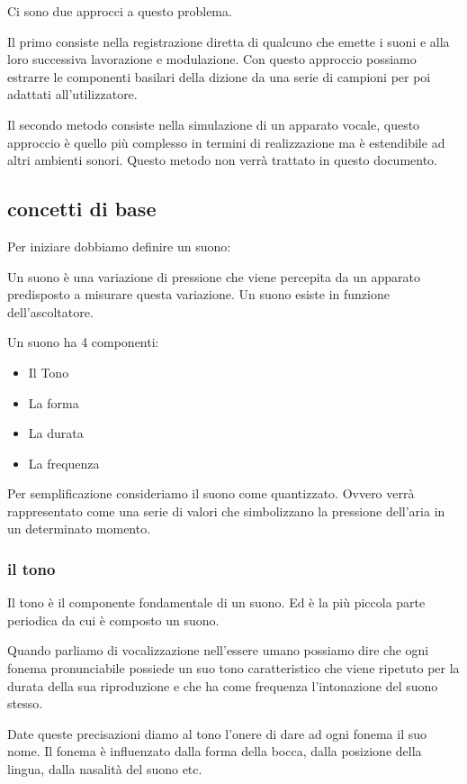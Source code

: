 \documentclass{article}
\begin{document}
Ci sono due approcci a questo problema.

Il primo consiste nella registrazione diretta di qualcuno che emette i suoni e alla loro successiva lavorazione e modulazione. Con questo approccio possiamo estrarre le componenti basilari della dizione da una serie di campioni per poi adattati all'utilizzatore.

Il secondo metodo consiste nella simulazione di un apparato vocale, questo approccio è quello più complesso in termini di realizzazione ma è estendibile ad altri ambienti sonori. Questo metodo non verrà trattato in questo documento.

\subsection{concetti di base}
Per iniziare dobbiamo definire un suono:

Un suono è una variazione di pressione che viene percepita da un apparato predisposto a misurare questa variazione. Un suono esiste in funzione dell’ascoltatore.

Un suono ha 4 componenti:
\begin{itemize}
	\item Il Tono
	\item La forma
	\item La durata
	\item La frequenza
\end{itemize}

Per semplificazione consideriamo il suono come quantizzato. Ovvero verrà rappresentato come una serie di valori che simbolizzano la pressione dell’aria in un determinato momento.

\subsubsection{il tono}
Il tono è il componente fondamentale di un suono. Ed è la più piccola parte periodica da cui è composto un suono.

Quando parliamo di vocalizzazione nell'essere umano possiamo dire che ogni fonema pronunciabile possiede un suo tono caratteristico che viene ripetuto per la durata della sua riproduzione e che ha come frequenza l’intonazione del suono stesso.

Date queste precisazioni diamo al tono l'onere di dare ad ogni fonema il suo nome. Il fonema è influenzato dalla forma della bocca, dalla posizione della lingua, dalla nasalità del suono etc.
\end{document}
